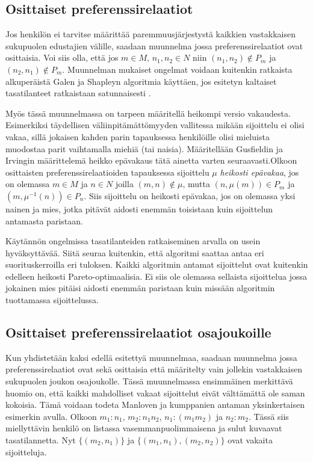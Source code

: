 \documentclass[gradu, twoside]{tktltiki}
\begin{document}
\subsection{Osittaiset preferenssirelaatiot}

Jos henkilön ei tarvitse määrittää paremmuusjärjestystä kaikkien
vastakkaisen sukupuolen edustajien välille, saadaan muunnelma jossa
preferenssirelaatiot ovat osittaisia. Voi siis olla, että jos $m \in
M$, $n_1,n_2 \in N$ niin $(n_1, n_2) \notin P_m$ ja $(n_2, n_1) \notin
P_m$. Muunnelman mukaiset ongelmat voidaan kuitenkin ratkaista
alkuperäistä Galen ja Shapleyn algoritmia käyttäen, jos esitetyn
kaltaiset tasatilanteet ratkaistaan satunnaisesti \cite[sivu
  31]{gusfield89}.

Myös tässä muunnelmassa on tarpeen määritellä heikompi versio
vakaudesta. Esimerkiksi täydellisen väliinpitämättömyyden vallitessa
mikään sijoittelu ei olisi vakaa, sillä jokaisen kahden parin
tapauksessa henkilöille olisi mieluista muodostaa parit vaihtamalla
miehiä (tai naisia). Määritellään Gusfieldin ja Irvingin määrittelemä
\cite[sivu 31]{gusfield89} heikko epävakaus tätä ainetta varten
seuraavasti.Olkoon osittaisten preferenssirelaatioiden tapauksessa
sijoittelu $\mu$ \emph{heikosti epävakaa}, jos on olemassa $m \in M$
ja $n \in N$ joilla $(m, n) \notin \mu$, mutta $(n, \mu(m)) \in P_m$
ja $(m, \mu^{-1}(n)) \in P_n$. Siis sijoittelu on heikosti epävakaa,
jos on olemassa yksi nainen ja mies, jotka pitävät aidosti enemmän
toisistaan kuin sijoittelun antamasta paristaan.

Käytännön ongelmissa tasatilanteiden ratkaiseminen arvalla on usein
hyväksyttävää. Siitä seuraa kuitenkin, että algoritmi saattaa antaa
eri suorituskerroilla eri tuloksen. Kaikki algoritmin antamat
sijoittelut ovat kuitenkin edelleen heikosti Pareto-optimaalisia. Ei
siis ole olemassa sellaista sijoittelua jossa jokainen mies pitäisi
aidosti enemmän paristaan kuin missään algoritmin tuottamassa
sijoittelussa.

\subsection{Osittaiset preferenssirelaatiot osajoukoille}

Kun yhdistetään kaksi edellä esitettyä muunnelmaa, saadaan muunnelma
jossa preferenssirelaatiot ovat sekä osittaisia että määritelty vain
jollekin vastakkaisen sukupuolen joukon osajoukolle. Tässä
muunnelmassa ensimmäinen merkittävä huomio on, että kaikki mahdolliset
vakaat sijoittelut eivät välttämättä ole saman kokoisia. Tämä voidaan
todeta Manloven ja kumppanien antaman \cite{manlove02} yksinkertaisen
esimerkin avulla. Olkoon $m_1: n_1$, $m_2: n_1 n_2$, $n_1: (m_1 m_2)$
ja $n_2: m_2$. Tässä siis miellyttävin henkilö on listassa
vasemmanpuolimmaisena ja sulut kuvaavat tasatilannetta. Nyt $\{(m_2,
n_1)\}$ ja $\{(m_1, n_1), (m_2, n_2)\}$ ovat vakaita sijoitteluja.
\end{document}
